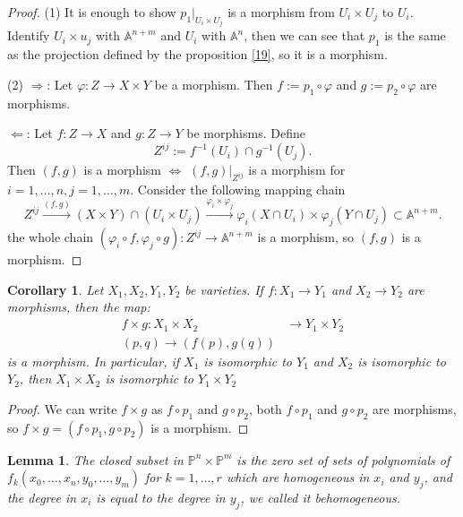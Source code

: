 \documentclass{amsart}
\theoremstyle{plain}
\newtheorem{corollary}{Corollary}
\newtheorem{lemma}{Lemma}
\theoremstyle{definition}
\theoremstyle{remark}
\numberwithin{equation}{section}
\begin{document}
\begin{proof}
	(1) It is enough to show $ p_1|_{U_i\times U_j} $ is a morphism from $ U_i\times U_j $ to $ U_i $. Identify $ U_i\times u_j $ with $ \mathbb{A}^{n+m} $ and $ U_i $ with $ \mathbb{A}^{n} $, then we can see that $ p_1 $ is the same as  the projection defined by the proposition \ref{19}, so it is a morphism.

	(2) $ \Rightarrow $: Let $ \varphi:Z\to X\times Y $ be a morphism. Then $ f:=p_1\circ \varphi $ and $ g:=p_2\circ \varphi $ are morphisms.

	$ \Leftarrow $: Let $ f:Z\to X $ and $ g:Z\to Y $ be morphisms. Define
	$$
	Z^{ij}:=f^{-1}(U_i)\cap g^{-1}(U_j).
	$$
	Then $ (f,g) $ is a morphism $ \Leftrightarrow $ $ (f,g)|_{Z^{ij}} $ is a morphism for $ i=1,\dots,n,j=1,\dots,m $. Consider the following mapping chain
	$$
		Z^{ij}\xrightarrow{(f,g)} (X\times Y)\cap (U_i\times U_j)\xrightarrow{\varphi_i\times \varphi_j}\varphi_i(X\cap U_i)\times \varphi_j(Y\cap U_j)\subset \mathbb{A}^{n+m}.
	$$
	the whole chain $ (\varphi_i\circ f,\varphi_j\circ g):Z^{ij}\to \mathbb{A}^{n+m} $ is a morphism, so $ (f,g) $ is a morphism.
\end{proof}
\begin{corollary}
	Let $ X_1,X_2,Y_1,Y_2 $ be varieties. If $ f:X_1\to Y_1 $ and $ X_2\to Y_2 $ are morphisms, then the map:
	$$\begin{array}{cc}
		f\times g :X_1\times X_2 & \to Y_1\times Y_2\\
		(p,q)\to (f(p),g(q))
	\end{array}$$
	is a morphism. In particular, if $ X_1 $ is isomorphic to $ Y_1 $ and $ X_2 $ is isomorphic to $ Y_2 $, then $ X_1\times X_2 $ is isomorphic to $ Y_1\times Y_2 $
\end{corollary}
\begin{proof}
	We can write $ f\times g $ as $ f\circ p_1 $ and $ g\circ p_2 $, both $ f\circ p_1 $ and $ g\circ p_2 $ are morphisms, so $ f\times g =(f\circ p_1,g\circ p_2) $ is a morphism.
\end{proof}
\begin{lemma}
	The closed subset in $ \mathbb{P}^n\times \mathbb{P}^m $ is the zero set of sets of polynomials of $ f_k(x_0,\dots,x_n,y_0,\dots,y_m) $ for $ k=1,\dots,r $ which are homogeneous in  $ x_i $ and $ y_j $, and the degree in $ x_i $ is equal to the degree in $ y_j $, we called it behomogeneous.
\end{lemma}
\end{document}
